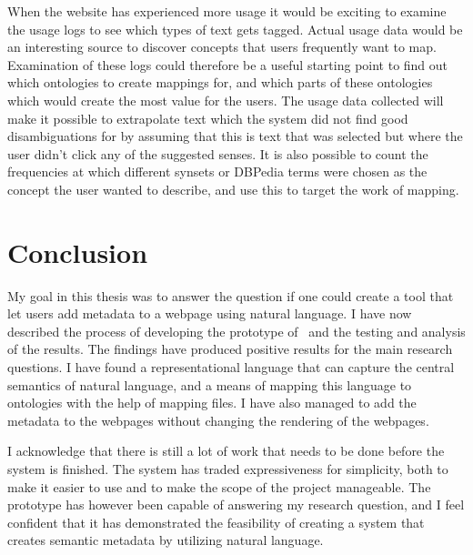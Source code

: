 When the website has experienced more usage it would be exciting to examine the usage logs to see which types of text gets tagged.
Actual usage data would be an interesting source to discover concepts that users frequently want to map.
Examination of these logs could therefore be a useful starting point to find out which ontologies to create mappings for,
and which parts of these ontologies which would create the most value for the users.
The usage data collected will make it possible to extrapolate text which the system did not find good disambiguations for
by assuming that this is text that was selected but where the user didn't click any of the suggested senses.
It is also possible to count the frequencies at which different synsets or DBPedia terms were chosen as the concept the
user wanted to describe, and use this to target the work of mapping.

\section{Conclusion}
My goal in this thesis was to answer the question if one could create a tool that let users add metadata to a webpage using
natural language.
I have now described the process of developing the prototype of \theartefact\ and the testing and analysis of the results.
The findings have produced positive results for the main research questions.
I have found a representational language that can capture the central semantics of natural language,
and a means of mapping this language to ontologies with the help of mapping files.
I have also managed to add the metadata to the webpages without changing the rendering of the webpages.

I acknowledge that there is still a lot of work that needs to be done before the system is finished.
The system has traded expressiveness for simplicity, both to make it easier to use and to make the scope of the project manageable.
The prototype has however been capable of answering my research question,
and I feel confident that it has demonstrated the feasibility of creating a system that creates semantic metadata by
utilizing natural language.
